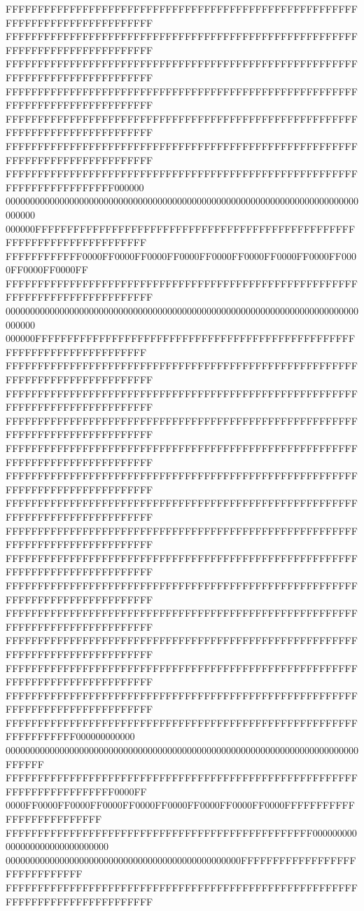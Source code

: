 FFFFFFFFFFFFFFFFFFFFFFFFFFFFFFFFFFFFFFFFFFFFFFFFFFFFFFFFFFFFFFFFFFFFFFFFFFFFFF
FFFFFFFFFFFFFFFFFFFFFFFFFFFFFFFFFFFFFFFFFFFFFFFFFFFFFFFFFFFFFFFFFFFFFFFFFFFFFF
FFFFFFFFFFFFFFFFFFFFFFFFFFFFFFFFFFFFFFFFFFFFFFFFFFFFFFFFFFFFFFFFFFFFFFFFFFFFFF
FFFFFFFFFFFFFFFFFFFFFFFFFFFFFFFFFFFFFFFFFFFFFFFFFFFFFFFFFFFFFFFFFFFFFFFFFFFFFF
FFFFFFFFFFFFFFFFFFFFFFFFFFFFFFFFFFFFFFFFFFFFFFFFFFFFFFFFFFFFFFFFFFFFFFFFFFFFFF
FFFFFFFFFFFFFFFFFFFFFFFFFFFFFFFFFFFFFFFFFFFFFFFFFFFFFFFFFFFFFFFFFFFFFFFFFFFFFF
FFFFFFFFFFFFFFFFFFFFFFFFFFFFFFFFFFFFFFFFFFFFFFFFFFFFFFFFFFFFFFFFFFFFFFFF000000
000000000000000000000000000000000000000000000000000000000000000000000000000000
000000FFFFFFFFFFFFFFFFFFFFFFFFFFFFFFFFFFFFFFFFFFFFFFFFFFFFFFFFFFFFFFFFFFFFFFFF
FFFFFFFFFFFF0000FF0000FF0000FF0000FF0000FF0000FF0000FF0000FF0000FF0000FF0000FF
FFFFFFFFFFFFFFFFFFFFFFFFFFFFFFFFFFFFFFFFFFFFFFFFFFFFFFFFFFFFFFFFFFFFFFFFFFFFFF
000000000000000000000000000000000000000000000000000000000000000000000000000000
000000FFFFFFFFFFFFFFFFFFFFFFFFFFFFFFFFFFFFFFFFFFFFFFFFFFFFFFFFFFFFFFFFFFFFFFFF
FFFFFFFFFFFFFFFFFFFFFFFFFFFFFFFFFFFFFFFFFFFFFFFFFFFFFFFFFFFFFFFFFFFFFFFFFFFFFF
FFFFFFFFFFFFFFFFFFFFFFFFFFFFFFFFFFFFFFFFFFFFFFFFFFFFFFFFFFFFFFFFFFFFFFFFFFFFFF
FFFFFFFFFFFFFFFFFFFFFFFFFFFFFFFFFFFFFFFFFFFFFFFFFFFFFFFFFFFFFFFFFFFFFFFFFFFFFF
FFFFFFFFFFFFFFFFFFFFFFFFFFFFFFFFFFFFFFFFFFFFFFFFFFFFFFFFFFFFFFFFFFFFFFFFFFFFFF
FFFFFFFFFFFFFFFFFFFFFFFFFFFFFFFFFFFFFFFFFFFFFFFFFFFFFFFFFFFFFFFFFFFFFFFFFFFFFF
FFFFFFFFFFFFFFFFFFFFFFFFFFFFFFFFFFFFFFFFFFFFFFFFFFFFFFFFFFFFFFFFFFFFFFFFFFFFFF
FFFFFFFFFFFFFFFFFFFFFFFFFFFFFFFFFFFFFFFFFFFFFFFFFFFFFFFFFFFFFFFFFFFFFFFFFFFFFF
FFFFFFFFFFFFFFFFFFFFFFFFFFFFFFFFFFFFFFFFFFFFFFFFFFFFFFFFFFFFFFFFFFFFFFFFFFFFFF
FFFFFFFFFFFFFFFFFFFFFFFFFFFFFFFFFFFFFFFFFFFFFFFFFFFFFFFFFFFFFFFFFFFFFFFFFFFFFF
FFFFFFFFFFFFFFFFFFFFFFFFFFFFFFFFFFFFFFFFFFFFFFFFFFFFFFFFFFFFFFFFFFFFFFFFFFFFFF
FFFFFFFFFFFFFFFFFFFFFFFFFFFFFFFFFFFFFFFFFFFFFFFFFFFFFFFFFFFFFFFFFFFFFFFFFFFFFF
FFFFFFFFFFFFFFFFFFFFFFFFFFFFFFFFFFFFFFFFFFFFFFFFFFFFFFFFFFFFFFFFFFFFFFFFFFFFFF
FFFFFFFFFFFFFFFFFFFFFFFFFFFFFFFFFFFFFFFFFFFFFFFFFFFFFFFFFFFFFFFFFFFFFFFFFFFFFF
FFFFFFFFFFFFFFFFFFFFFFFFFFFFFFFFFFFFFFFFFFFFFFFFFFFFFFFFFFFFFFFFFF000000000000
000000000000000000000000000000000000000000000000000000000000000000000000FFFFFF
FFFFFFFFFFFFFFFFFFFFFFFFFFFFFFFFFFFFFFFFFFFFFFFFFFFFFFFFFFFFFFFFFFFFFFFF0000FF
0000FF0000FF0000FF0000FF0000FF0000FF0000FF0000FF0000FFFFFFFFFFFFFFFFFFFFFFFFFF
FFFFFFFFFFFFFFFFFFFFFFFFFFFFFFFFFFFFFFFFFFFFFFFF000000000000000000000000000000
000000000000000000000000000000000000000000000000FFFFFFFFFFFFFFFFFFFFFFFFFFFFFF
FFFFFFFFFFFFFFFFFFFFFFFFFFFFFFFFFFFFFFFFFFFFFFFFFFFFFFFFFFFFFFFFFFFFFFFFFFFFFF
